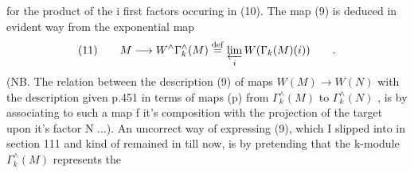 for the product of the i first factors occuring in (10).   The map (9)
is  deduced in evident way from the exponential map
\[ (11) \qquad M \longrightarrow W^{\wedge}\Gamma_k^{\wedge}(M) \overset{\mathrm{def}}{=} \varprojlim_{i} W(\Gamma_k(M)(i)) \qquad . \]
(NB.  The relation between the description (9) of maps $W(M) \rightarrow W(N)$ with
the description given p.451  in terms of maps (p) from $\Gamma_k^{\wedge}(M)$ to
$\Gamma_k^{\wedge}(N)$ ,  is by associating to such a map f it's composition with the
projection of the target upon it's factor N ...).  An uncorrect way of
expressing (9),  which I slipped into in section 111 and kind of remained
in till now,  is by pretending that the k-module  $\Gamma_k^{\wedge}(M)$ represents the

